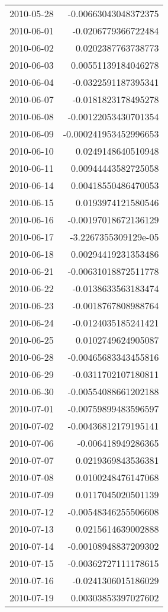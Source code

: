 \begin{tabular}{l | r}
2010-05-28 & -0.00663043048372375 \\
2010-06-01 & -0.0206779366722484 \\
2010-06-02 & 0.0202387763738773 \\
2010-06-03 & 0.00551139184046278 \\
2010-06-04 & -0.0322591187395341 \\
2010-06-07 & -0.0181823178495278 \\
2010-06-08 & -0.00122053430701354 \\
2010-06-09 & -0.000241953452996653 \\
2010-06-10 & 0.0249148640510948 \\
2010-06-11 & 0.00944443582725058 \\
2010-06-14 & 0.00418550486470053 \\
2010-06-15 & 0.0193974121580546 \\
2010-06-16 & -0.00197018672136129 \\
2010-06-17 & -3.2267355309129e-05 \\
2010-06-18 & 0.00294419231353486 \\
2010-06-21 & -0.00631018872511778 \\
2010-06-22 & -0.0138633563183474 \\
2010-06-23 & -0.0018767808988764 \\
2010-06-24 & -0.0124035185241421 \\
2010-06-25 & 0.0102749624905087 \\
2010-06-28 & -0.00465683343455816 \\
2010-06-29 & -0.0311702107180811 \\
2010-06-30 & -0.00554088661202188 \\
2010-07-01 & -0.00759899483596597 \\
2010-07-02 & -0.00436812179195141 \\
2010-07-06 & -0.006418949286365 \\
2010-07-07 & 0.0219369843536381 \\
2010-07-08 & 0.0100248476147068 \\
2010-07-09 & 0.0117045020501139 \\
2010-07-12 & -0.00548346255506608 \\
2010-07-13 & 0.0215614639002888 \\
2010-07-14 & -0.00108948837209302 \\
2010-07-15 & -0.00362727111178615 \\
2010-07-16 & -0.0241306015186029 \\
2010-07-19 & 0.00303853397027602 \\

\end{tabular}
